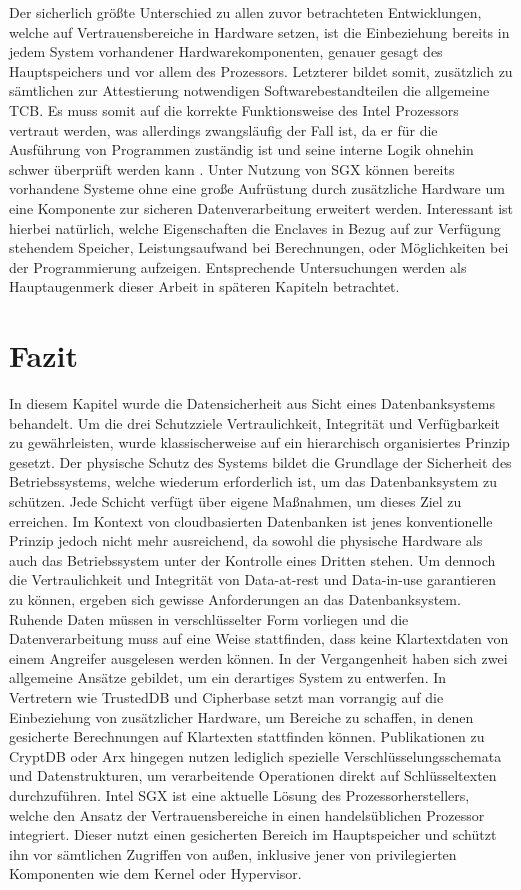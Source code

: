 Der sicherlich größte Unterschied zu allen zuvor betrachteten Entwicklungen, welche auf Vertrauensbereiche in Hardware setzen, ist die Einbeziehung bereits in jedem System vorhandener Hardwarekomponenten, genauer gesagt des Hauptspeichers und vor allem des Prozessors. Letzterer bildet somit, zusätzlich zu sämtlichen zur Attestierung notwendigen Softwarebestandteilen die allgemeine \ac{TCB}. Es muss somit auf die korrekte Funktionsweise des Intel Prozessors vertraut werden, was allerdings zwangsläufig der Fall ist, da er für die Ausführung von Programmen zuständig ist und seine interne Logik ohnehin schwer überprüft werden kann \cite{Aumasson2016}. Unter Nutzung von \ac{SGX} können bereits vorhandene Systeme ohne eine große Aufrüstung durch zusätzliche Hardware um eine Komponente zur sicheren Datenverarbeitung erweitert werden. Interessant ist hierbei natürlich, welche Eigenschaften die Enclaves in Bezug auf zur Verfügung stehendem Speicher, Leistungsaufwand bei Berechnungen, oder Möglichkeiten bei der Programmierung aufzeigen. Entsprechende Untersuchungen werden als Hauptaugenmerk dieser Arbeit in späteren Kapiteln betrachtet.

\section{Fazit}

In diesem Kapitel wurde die Datensicherheit aus Sicht eines Datenbanksystems behandelt. Um die drei Schutzziele Vertraulichkeit, Integrität und Verfügbarkeit zu gewährleisten, wurde klassischerweise auf ein hierarchisch organisiertes Prinzip gesetzt. Der physische Schutz des Systems bildet die Grundlage der Sicherheit des Betriebssystems, welche wiederum erforderlich ist, um das Datenbanksystem zu schützen. Jede Schicht verfügt über eigene Maßnahmen, um dieses Ziel zu erreichen. Im Kontext von cloudbasierten Datenbanken ist jenes konventionelle Prinzip jedoch nicht mehr ausreichend, da sowohl die physische Hardware als auch das Betriebssystem unter der Kontrolle eines Dritten stehen. Um dennoch die Vertraulichkeit und Integrität von Data-at-rest und Data-in-use garantieren zu können, ergeben sich gewisse Anforderungen an das Datenbanksystem. Ruhende Daten müssen in verschlüsselter Form vorliegen und die Datenverarbeitung muss auf eine Weise stattfinden, dass keine Klartextdaten von einem Angreifer ausgelesen werden können. In der Vergangenheit haben sich zwei allgemeine Ansätze gebildet, um ein derartiges System zu entwerfen. In Vertretern wie TrustedDB und Cipherbase setzt man vorrangig auf die Einbeziehung von zusätzlicher Hardware, um Bereiche zu schaffen, in denen gesicherte Berechnungen auf Klartexten stattfinden können. Publikationen zu CryptDB oder Arx hingegen nutzen lediglich spezielle Verschlüsselungsschemata und Datenstrukturen, um verarbeitende Operationen direkt auf Schlüsseltexten durchzuführen. Intel \ac{SGX} ist eine aktuelle Lösung des Prozessorherstellers, welche den Ansatz der Vertrauensbereiche in einen handelsüblichen Prozessor integriert. Dieser nutzt einen gesicherten Bereich im Hauptspeicher und schützt ihn vor sämtlichen Zugriffen von außen, inklusive jener von privilegierten Komponenten wie dem Kernel oder Hypervisor.
